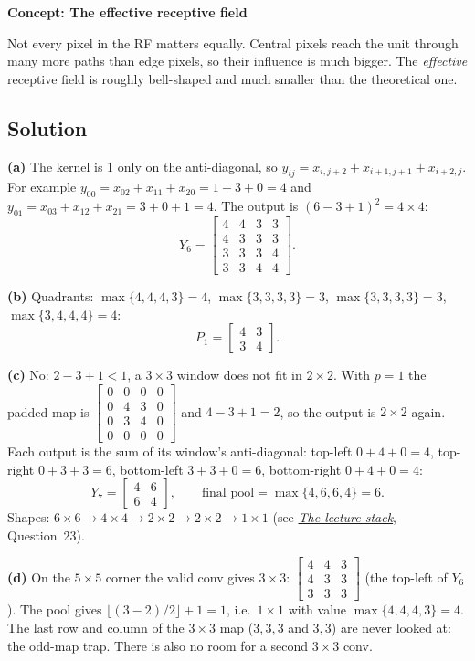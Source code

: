 \documentclass[12pt,a4paper]{article}
\newcommand{\concept}[2]{\par\medskip\phantomsection\label{#1}{\large\bfseries\color{blue!50!black} Concept: #2}\par}
\newcommand{\seeconcept}[3]{(see \hyperref[#1]{\textit{#2}}, Question~#3)}
\begin{document}
\concept{c:effrf}{The effective receptive field}
Not every pixel in the RF matters equally. Central pixels reach the unit through many more paths than edge pixels, so their influence is much bigger. The \emph{effective} receptive field is roughly bell-shaped and much smaller than the theoretical one.

\subsection*{Solution}
\textbf{(a)} The kernel is 1 only on the anti-diagonal, so $y_{ij}=x_{i,j+2}+x_{i+1,j+1}+x_{i+2,j}$. For example $y_{00}=x_{02}+x_{11}+x_{20}=1+3+0=4$ and $y_{01}=x_{03}+x_{12}+x_{21}=3+0+1=4$. The output is $(6-3+1)^2=4\times4$:
\[
Y_6=\begin{bmatrix}4&4&3&3\\4&3&3&3\\3&3&3&4\\3&3&4&4\end{bmatrix}.
\]

\textbf{(b)} Quadrants: $\max\{4,4,4,3\}=4$, $\max\{3,3,3,3\}=3$, $\max\{3,3,3,3\}=3$, $\max\{3,4,4,4\}=4$:
\[
P_1=\begin{bmatrix}4&3\\3&4\end{bmatrix}.
\]

\textbf{(c)} No: $2-3+1<1$, a $3\times3$ window does not fit in $2\times2$. With $p=1$ the padded map is $\begin{bmatrix}0&0&0&0\\0&4&3&0\\0&3&4&0\\0&0&0&0\end{bmatrix}$ and $4-3+1=2$, so the output is $2\times2$ again. Each output is the sum of its window's anti-diagonal: top-left $0+4+0=4$, top-right $0+3+3=6$, bottom-left $3+3+0=6$, bottom-right $0+4+0=4$:
\[
Y_7=\begin{bmatrix}4&6\\6&4\end{bmatrix},\qquad \text{final pool}=\max\{4,6,6,4\}=6 .
\]
Shapes: $6\times6\to4\times4\to2\times2\to2\times2\to1\times1$ \seeconcept{c:stack}{The lecture stack}{23}.

\textbf{(d)} On the $5\times5$ corner the valid conv gives $3\times3$: $\begin{bmatrix}4&4&3\\4&3&3\\3&3&3\end{bmatrix}$ (the top-left of $Y_6$). The pool gives $\lfloor(3-2)/2\rfloor+1=1$, i.e.\ $1\times1$ with value $\max\{4,4,4,3\}=4$. The last row and column of the $3\times3$ map ($3,3,3$ and $3,3$) are never looked at: the odd-map trap. There is also no room for a second $3\times3$ conv.
\end{document}

